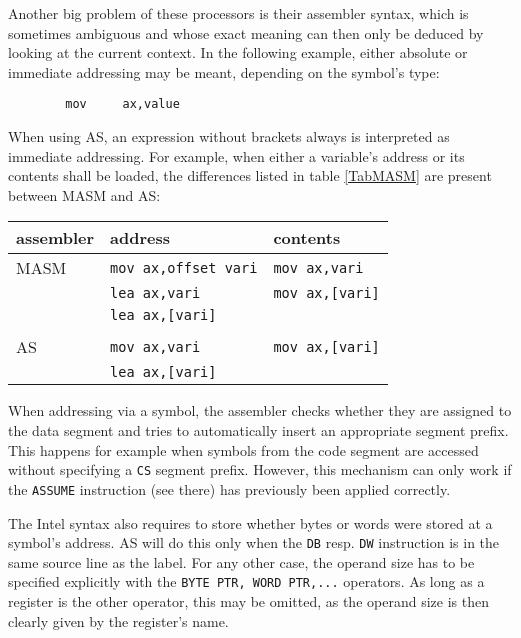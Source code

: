 \documentclass[12pt,twoside]{report}
\newcommand{\tty}[1]{{\tt #1}}
\begin{document}
Another big problem of these processors is their assembler syntax,
which is sometimes ambiguous and whose exact meaning can then only be
deduced by looking at the current context.  In the following example,
either absolute or immediate addressing may be meant, depending on
the symbol's type:
\begin{verbatim}
        mov     ax,value
\end{verbatim}
When using AS, an expression without brackets always is interpreted
as immediate addressing.  For example, when either a variable's
address or its contents shall be loaded, the differences listed in table
\ref{TabMASM} are present between MASM and AS:
\begin{table*}
\begin{center}\begin{tabular}{|l|l|l|}
\hline
assembler  & address             & contents \\
\hline
\hline
MASM       &  \tty{mov ax,offset vari} &  \tty{mov ax,vari} \\
           &  \tty{lea ax,vari}        &  \tty{mov ax,[vari]} \\
           &  \tty{lea ax,[vari]}      & \\
           &                           & \\
AS         &  \tty{mov ax,vari}        &  \tty{mov ax,[vari]} \\
           &  \tty{lea ax,[vari]}      & \\
\hline
\end{tabular}\end{center}
\caption{Differences AS$\leftrightarrow$MASM Concerning Addressing
         Syntax\label{TabMASM}}
\end{table*}
\par
When addressing via a symbol, the assembler checks whether they are
assigned to the data segment and tries to automatically insert an
appropriate segment prefix.  This happens for example when symbols
from the code segment are accessed without specifying a \tty{CS} segment
prefix.  However, this mechanism can only work if the \tty{ASSUME}
instruction (see there) has previously been applied correctly.

The Intel syntax also requires to store whether bytes or words were
stored at a symbol's address.  AS will do this only when the \tty{DB} resp.
\tty{DW} instruction is in the same source line as the label.  For any
other case, the operand size has to be specified explicitly with the
\tty{BYTE PTR, WORD PTR,...} operators.  As long as a register is the other
operator, this may be omitted, as the operand size is then clearly
given by the register's name.
\end{document}
